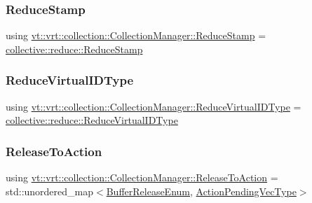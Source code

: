 \subsubsection{\texorpdfstring{Reduce\+Stamp}{ReduceStamp}}
{\footnotesize\ttfamily using \hyperlink{structvt_1_1vrt_1_1collection_1_1_collection_manager_ae8aac19e0ae07e9225142e5880eac830}{vt\+::vrt\+::collection\+::\+Collection\+Manager\+::\+Reduce\+Stamp} =  \hyperlink{namespacevt_1_1collective_1_1reduce_a7b7cb3021ac5654d92825d9fab0250b2}{collective\+::reduce\+::\+Reduce\+Stamp}}

\mbox{\label{structvt_1_1vrt_1_1collection_1_1_collection_manager_ae820c8c22ae8c7350fa0232e0749b097}} 
\subsubsection{\texorpdfstring{Reduce\+Virtual\+I\+D\+Type}{ReduceVirtualIDType}}
{\footnotesize\ttfamily using \hyperlink{structvt_1_1vrt_1_1collection_1_1_collection_manager_ae820c8c22ae8c7350fa0232e0749b097}{vt\+::vrt\+::collection\+::\+Collection\+Manager\+::\+Reduce\+Virtual\+I\+D\+Type} =  \hyperlink{namespacevt_1_1collective_1_1reduce_a6d4ad09f8584c3ec79f46944eb773376}{collective\+::reduce\+::\+Reduce\+Virtual\+I\+D\+Type}}

\mbox{\label{structvt_1_1vrt_1_1collection_1_1_collection_manager_abf98645da5d52c568fae8ed6f11ab82f}} 
\subsubsection{\texorpdfstring{Release\+To\+Action}{ReleaseToAction}}
{\footnotesize\ttfamily using \hyperlink{structvt_1_1vrt_1_1collection_1_1_collection_manager_abf98645da5d52c568fae8ed6f11ab82f}{vt\+::vrt\+::collection\+::\+Collection\+Manager\+::\+Release\+To\+Action} =  std\+::unordered\+\_\+map$<$\hyperlink{namespacevt_1_1vrt_1_1collection_a2545006e681bacc1f00be9d5d6bdc8fa}{Buffer\+Release\+Enum}, \hyperlink{structvt_1_1vrt_1_1collection_1_1_collection_manager_a3e6c49166f298e9aada17c9dcaa080dd}{Action\+Pending\+Vec\+Type}$>$\hspace{0.3cm}{\ttfamily [private]}}

